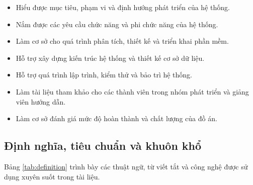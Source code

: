 \documentclass[a4paper,12pt]{article}
\begin{document}
\begin{itemize}
\item Hiểu được mục tiêu, phạm vi và định hướng phát triển của hệ thống.

\item Nắm được các yêu cầu chức năng và phi chức năng của hệ thống.

\item Làm cơ sở cho quá trình phân tích, thiết kế và triển khai phần mềm.

\item Hỗ trợ xây dựng kiến trúc hệ thống và thiết kế cơ sở dữ liệu.

\item Hỗ trợ quá trình lập trình, kiểm thử và bảo trì hệ thống.

\item Làm tài liệu tham khảo cho các thành viên trong nhóm phát triển và giảng viên hướng dẫn.

\item Làm cơ sở đánh giá mức độ hoàn thành và chất lượng của đồ án.

\end{itemize}

\subsection{Định nghĩa, tiêu chuẩn và khuôn khổ}
Bảng \ref{tab:definition} trình bày các thuật ngữ, từ viết tắt và công nghệ được sử dụng xuyên suốt trong tài liệu.
\end{document}
